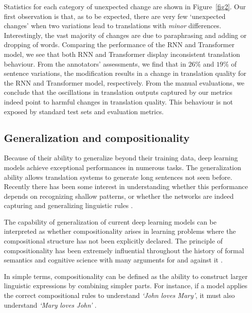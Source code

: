 Statistics for each category of unexpected change are shown in Figure~\ref{fig2}.
Our first observation is that, as to be expected, there are very few `unexpected changes' when two variations lead to translations with \textit{minor} differences.
Interestingly, the vast majority of changes are due to paraphrasing and adding or dropping of words.
Comparing the performance of the RNN and Transformer model, we see that both RNN and Transformer display inconsistent translation behaviour. 
From the annotators' assessments, we find that in $26\%$ and $19\%$ of sentence variations, the modification results in a change in translation quality for the RNN and Transformer model, respectively.
From the manual evaluations, we conclude that the oscillations in translation outputs captured by our metrics indeed point to harmful changes in translation quality. 
This behaviour is not exposed by standard test sets and evaluation metrics. 

\subsection{Generalization and compositionality}


Because of their ability to generalize beyond their training data, deep learning models achieve exceptional performances in numerous tasks.
The generalization ability allows translation systems to generate long sentences not seen before. 
Recently there has been some interest in understanding whether this performance depends on recognizing
shallow patterns, or whether the networks are indeed capturing and generalizing linguistic rules \citep{linzen-etal-2016-assessing,chowdhury-zamparelli-2018-rnn}.

The capability of generalization of current deep learning models can be interpreted as whether compositionality arises in learning problems where the compositional structure has not been explicitly declared.
The principle of compositionality \citep{Frege1892} has been extremely influential throughout the history of formal semantics and cognitive science with many arguments for and against it \citep{montague1974d,Pelletier94theprinciple,DBLP:journals/jolli/Janssen01}. 

In simple terms, compositionality can be defined as the ability to construct larger linguistic expressions by combining simpler parts. For instance, if a model applies the correct compositional rules to understand \textit{`John loves Mary'}, it must also understand \textit{`Mary loves John'} \citep{fodor2002compositionality}.


